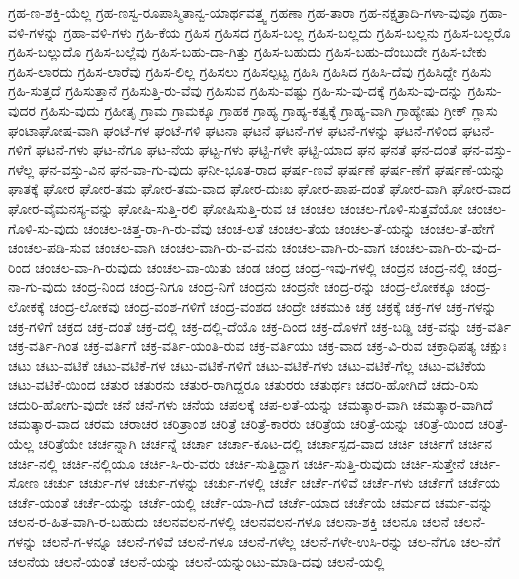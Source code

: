 {ಗ್ರಹ-ಣ-ಶಕ್ತಿ-ಯೆಲ್ಲ
ಗ್ರಹ-ಣಸ್ವ-ರೂಪಾಸ್ಮಿತಾನ್ವ-ಯಾರ್ಥವತ್ತ್ವ
ಗ್ರಹಣಾ
ಗ್ರಹ-ತಾರಾ
ಗ್ರಹ-ನಕ್ಷತ್ರಾದಿ-ಗಳಾ-ವುವೂ
ಗ್ರಹಾ-ವಳಿ-ಗಳನ್ನು
ಗ್ರಹಾ-ವಳಿ-ಗಳು
ಗ್ರಹಿ-ಕೆಯ
ಗ್ರಹಿಸ
ಗ್ರಹಿಸದ
ಗ್ರಹಿಸ-ಬಲ್ಲ
ಗ್ರಹಿಸ-ಬಲ್ಲದು
ಗ್ರಹಿಸ-ಬಲ್ಲನು
ಗ್ರಹಿಸ-ಬಲ್ಲರೊ
ಗ್ರಹಿಸ-ಬಲ್ಲುದೊ
ಗ್ರಹಿಸ-ಬಲ್ಲೆವು
ಗ್ರಹಿಸ-ಬಹು-ದಾ-ಗಿತ್ತು
ಗ್ರಹಿಸ-ಬಹುದು
ಗ್ರಹಿಸ-ಬಹು-ದೆಂಬುದೇ
ಗ್ರಹಿಸ-ಬೇಕು
ಗ್ರಹಿಸ-ಲಾರದು
ಗ್ರಹಿಸ-ಲಾರೆವು
ಗ್ರಹಿಸ-ಲಿಲ್ಲ
ಗ್ರಹಿಸಲು
ಗ್ರಹಿಸಲ್ಪಟ್ಟ
ಗ್ರಹಿಸಿ
ಗ್ರಹಿಸಿದ
ಗ್ರಹಿಸಿ-ದೆವು
ಗ್ರಹಿಸಿದ್ದೇ
ಗ್ರಹಿಸು
ಗ್ರಹಿ-ಸುತ್ತದೆ
ಗ್ರಹಿಸುತ್ತಾನೆ
ಗ್ರಹಿಸುತ್ತಿ-ರು-ವೆವು
ಗ್ರಹಿಸುವ
ಗ್ರಹಿಸು-ವಷ್ಟು
ಗ್ರಹಿ-ಸು-ವು-ದಕ್ಕೆ
ಗ್ರಹಿಸು-ವು-ದನ್ನು
ಗ್ರಹಿಸು-ವುದರ
ಗ್ರಹಿಸು-ವುದು
ಗ್ರಹೀತೃ
ಗ್ರಾಮ
ಗ್ರಾಮಕ್ಕೂ
ಗ್ರಾಹಕ
ಗ್ರಾಹ್ಯ
ಗ್ರಾಹ್ಯ-ಕತ್ವಕ್ಕೆ
ಗ್ರಾಹ್ಯ-ವಾಗಿ
ಗ್ರಾಹ್ಯೇಷು
ಗ್ರೀಕ್
ಗ್ಲಾಸು
ಘಂಟಾಘೋಷ-ವಾಗಿ
ಘಂಟೆ-ಗಳ
ಘಂಟೆ-ಗಳಿ
ಘಟನಾ
ಘಟನೆ
ಘಟನೆ-ಗಳ
ಘಟನೆ-ಗಳನ್ನು
ಘಟನೆ-ಗಳಿಂದ
ಘಟನೆ-ಗಳಿಗೆ
ಘಟನೆ-ಗಳು
ಘಟ-ನೆಗೂ
ಘಟ-ನೆಯ
ಘಟ್ಟ-ಗಳು
ಘಟ್ಟಿ-ಗಳೇ
ಘಟ್ಟಿ-ಯಾದ
ಘನ
ಘನತೆ
ಘನ-ದಂತೆ
ಘನ-ವಸ್ತು-ಗಳೆಲ್ಲ
ಘನ-ವಸ್ತು-ವಿನ
ಘನ-ವಾ-ಗು-ವುದು
ಘನೀ-ಭೂತ-ರಾದ
ಘರ್ಷ-ಣವೆ
ಘರ್ಷಣೆ
ಘರ್ಷ-ಣೆಗೆ
ಘರ್ಷಣೆ-ಯನ್ನು
ಘಾತಕ್ಕೆ
ಘೋರ
ಘೋರ-ತಮ
ಘೋರ-ತಮ-ವಾದ
ಘೋರ-ದುಃಖ
ಘೋರ-ಪಾಪ-ದಂತೆ
ಘೋರ-ವಾಗಿ
ಘೋರ-ವಾದ
ಘೋರ-ವೈಮನಸ್ಯ-ವನ್ನು
ಘೋಷಿ-ಸುತ್ತಿ-ರಲಿ
ಘೋಷಿಸುತ್ತಿ-ರುವ
ಚ
ಚಂಚಲ
ಚಂಚಲ-ಗೊಳಿ-ಸುತ್ತವೆಯೋ
ಚಂಚಲ-ಗೊಳಿ-ಸು-ವುದು
ಚಂಚಲ-ಚಿತ್ತ-ರಾ-ಗಿ-ರು-ವೆವು
ಚಂಚ-ಲತೆ
ಚಂಚಲ-ತೆಯ
ಚಂಚಲ-ತೆ-ಯನ್ನು
ಚಂಚಲ-ತೆ-ಹೇಗೆ
ಚಂಚಲ-ಪಡಿ-ಸುವ
ಚಂಚಲ-ವಾಗಿ
ಚಂಚಲ-ವಾಗಿ-ರು-ವ-ವನು
ಚಂಚಲ-ವಾಗಿ-ರು-ವಾಗ
ಚಂಚಲ-ವಾಗಿ-ರು-ವು-ದ-ರಿಂದ
ಚಂಚಲ-ವಾ-ಗಿ-ರುವುದು
ಚಂಚಲ-ವಾ-ಯಿತು
ಚಂಡ
ಚಂದ್ರ
ಚಂದ್ರ-ಇವು-ಗಳಲ್ಲಿ
ಚಂದ್ರನ
ಚಂದ್ರ-ನಲ್ಲಿ
ಚಂದ್ರ-ನಾ-ಗು-ವುದು
ಚಂದ್ರ-ನಿಂದ
ಚಂದ್ರ-ನಿಗೂ
ಚಂದ್ರ-ನಿಗೆ
ಚಂದ್ರನು
ಚಂದ್ರನೇ
ಚಂದ್ರ-ರನ್ನು
ಚಂದ್ರ-ಲೋಕಕ್ಕೂ
ಚಂದ್ರ-ಲೋಕಕ್ಕೆ
ಚಂದ್ರ-ಲೋಕವು
ಚಂದ್ರ-ವಂಶ-ಗಳಿಗೆ
ಚಂದ್ರ-ವಂಶದ
ಚಂದ್ರೇ
ಚಕಮುಕಿ
ಚಕ್ರ
ಚಕ್ರಕ್ಕೆ
ಚಕ್ರ-ಗಳ
ಚಕ್ರ-ಗಳನ್ನು
ಚಕ್ರ-ಗಳಿಗೆ
ಚಕ್ರದ
ಚಕ್ರ-ದಂತೆ
ಚಕ್ರ-ದಲ್ಲಿ
ಚಕ್ರ-ದಲ್ಲಿ-ದೆಯೊ
ಚಕ್ರ-ದಿಂದ
ಚಕ್ರ-ದೊಳಗೆ
ಚಕ್ರ-ಬಡ್ಡಿ
ಚಕ್ರ-ವನ್ನು
ಚಕ್ರ-ವರ್ತಿ
ಚಕ್ರ-ವರ್ತಿ-ಗಿಂತ
ಚಕ್ರ-ವರ್ತಿಗೆ
ಚಕ್ರ-ವರ್ತಿ-ಯಂತಿ-ರುವ
ಚಕ್ರ-ವರ್ತಿಯು
ಚಕ್ರ-ವಾದ
ಚಕ್ರ-ವಿ-ರುವ
ಚಕ್ರಾಧಿಪತ್ಯ
ಚಕ್ಷುಃ
ಚಟು
ಚಟು-ವಟಿಕೆ
ಚಟು-ವಟಿಕೆ-ಗಳ
ಚಟು-ವಟಿಕೆ-ಗಳಿಗೆ
ಚಟು-ವಟಿಕೆ-ಗಳು
ಚಟು-ವಟಿಕೆ-ಗೆಲ್ಲ
ಚಟು-ವಟಿಕೆಯ
ಚಟು-ವಟಿಕೆ-ಯಿಂದ
ಚತುರ
ಚತುರನು
ಚತುರ-ರಾಗಿದ್ದರೂ
ಚತುರರು
ಚತುರ್ಥಃ
ಚದರಿ-ಹೋಗಿದೆ
ಚದು-ರಿಸು
ಚದುರಿ-ಹೋಗು-ವುದೇ
ಚನೆ
ಚನೆ-ಗಳು
ಚನೆಯ
ಚಪಲಕ್ಕೆ
ಚಪ-ಲತೆ-ಯನ್ನು
ಚಮತ್ಕಾರ-ವಾಗಿ
ಚಮತ್ಕಾರ-ವಾಗಿದೆ
ಚಮತ್ಕಾರ-ವಾದ
ಚರಮ
ಚರಾಚರ
ಚರಿತ್ರಾಂಶ
ಚರಿತ್ರೆ
ಚರಿತ್ರೆ-ಕಾರರು
ಚರಿತ್ರೆಯ
ಚರಿತ್ರೆ-ಯನ್ನು
ಚರಿತ್ರೆ-ಯಿಂದ
ಚರಿತ್ರೆ-ಯೆಲ್ಲ
ಚರಿತ್ರೆಯೇ
ಚರ್ಚನ್ನಾಗಿ
ಚರ್ಚನ್ನೆ
ಚರ್ಚಾ
ಚರ್ಚಾ-ಕೂಟ-ದಲ್ಲಿ
ಚರ್ಚಾಸ್ಪದ-ವಾದ
ಚರ್ಚಿ
ಚರ್ಚಿಗೆ
ಚರ್ಚಿನ
ಚರ್ಚಿ-ನಲ್ಲಿ
ಚರ್ಚಿ-ನಲ್ಲಿಯೂ
ಚರ್ಚಿ-ಸಿ-ರು-ವರು
ಚರ್ಚಿ-ಸುತ್ತಿದ್ದಾಗ
ಚರ್ಚಿ-ಸುತ್ತಿ-ರುವುದು
ಚರ್ಚಿ-ಸುತ್ತೇನೆ
ಚರ್ಚಿ-ಸೋಣ
ಚರ್ಚು
ಚರ್ಚು-ಗಳ
ಚರ್ಚು-ಗಳನ್ನು
ಚರ್ಚು-ಗಳಲ್ಲಿ
ಚರ್ಚೆ
ಚರ್ಚೆ-ಗಳಿವೆ
ಚರ್ಚೆ-ಗಳು
ಚರ್ಚೆಗೆ
ಚರ್ಚೆಯ
ಚರ್ಚೆ-ಯಂತೆ
ಚರ್ಚೆ-ಯನ್ನು
ಚರ್ಚೆ-ಯಲ್ಲಿ
ಚರ್ಚೆ-ಯಾ-ಗಿದೆ
ಚರ್ಚೆ-ಯಾದ
ಚರ್ಚೆಯೆ
ಚರ್ಮದ
ಚರ್ಮ-ವನ್ನು
ಚಲನ-ರ-ಹಿತ-ವಾಗಿ-ರ-ಬಹುದು
ಚಲನವಲನ-ಗಳಲ್ಲಿ
ಚಲನವಲನ-ಗಳೂ
ಚಲನಾ-ಶಕ್ತಿ
ಚಲನೂ
ಚಲನೆ
ಚಲನೆ-ಗಳನ್ನು
ಚಲನೆ-ಗ-ಳನ್ನೂ
ಚಲನೆ-ಗಳಿವೆ
ಚಲನೆ-ಗಳೂ
ಚಲನೆ-ಗಳೆಲ್ಲ
ಚಲನೆ-ಗಳೇ-ಉಸಿ-ರನ್ನು
ಚಲ-ನೆಗೂ
ಚಲ-ನೆಗೆ
ಚಲನೆಯ
ಚಲನೆ-ಯಂತೆ
ಚಲನೆ-ಯನ್ನು
ಚಲನೆ-ಯನ್ನುಂಟು-ಮಾಡಿ-ದವು
ಚಲನೆ-ಯಲ್ಲಿ
}
